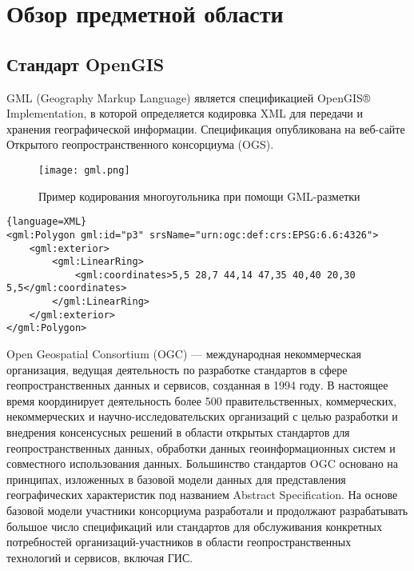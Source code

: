 \section{Обзор предметной области}
\label{}

\subsection{Стандарт OpenGIS}
\label{}

GML (Geography Markup Language) является спецификацией OpenGIS® Implementation, в которой определяется кодировка XML для передачи и хранения географической информации. Спецификация опубликована на веб-сайте Открытого геопространственного консорциума (OGS).\\

\begin{figure}[h]
    \centering
    \texttt{[image: gml.png]}
    \caption{Пример кодирования многоугольника при помощи GML-разметки}
\end{figure}
\begin{lstlisting}[tabsize=2,breaklines,frame=single]{language=XML}
<gml:Polygon gml:id="p3" srsName="urn:ogc:def:crs:EPSG:6.6:4326">
	<gml:exterior>
		<gml:LinearRing>
			<gml:coordinates>5,5 28,7 44,14 47,35 40,40 20,30 5,5</gml:coordinates>
		</gml:LinearRing>
	</gml:exterior>
</gml:Polygon>
\end{lstlisting}

Open Geospatial Consortium (OGC) — международная некоммерческая организация, ведущая деятельность по разработке стандартов в сфере геопространственных данных и сервисов, созданная в 1994 году. В настоящее время координирует деятельность более 500 \cite{noauthor_open_nodate} правительственных, коммерческих, некоммерческих и научно-исследовательских организаций с целью разработки и внедрения консенсусных решений в области открытых стандартов для геопространственных данных, обработки данных геоинформационных систем и совместного использования данных. Большинство стандартов OGC основано на принципах, изложенных в базовой модели данных для представления географических характеристик под названием Abstract Specification. На основе базовой модели участники консорциума разработали и продолжают разрабатывать большое число спецификаций или стандартов для обслуживания конкретных потребностей организаций-участников в области геопространственных технологий и сервисов, включая ГИС.

